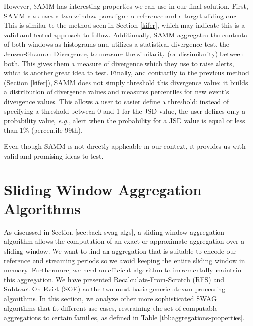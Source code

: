 However, SAMM has interesting properties we can use in our final solution. First, SAMM also uses a two-window paradigm: a reference and a target sliding one. This is similar to the method seen in Section \ref{kifer}, which may indicate this is a valid and tested approach to follow. Additionally, SAMM aggregates the contents of both windows as histograms and utilizes a statistical divergence test, the Jensen-Shannon Divergence, to measure the similarity (or dissimilarity) between both. This gives them a measure of divergence which they use to raise alerts, which is another great idea to test. Finally, and contrarily to the previous method (Section \ref{kifer}), SAMM does not simply threshold this divergence value: it builds a distribution of divergence values and measures percentiles for new event's divergence values. This allows a user to easier define a threshold: instead of specifying a threshold between 0 and 1 for the JSD value, the user defines only a probability value, \textit{e.g.}, alert when the probability for a JSD value is equal or less than 1\% (percentile 99th).

Even though SAMM is not directly applicable in our context, it provides us with valid and promising ideas to test.


\section{Sliding Window Aggregation Algorithms} \label{sec:sota-swag-algs}

As discussed in Section \ref{sec:back-swag-algs}, a sliding window aggregation algorithm allows the computation of an exact or approximate aggregation over a sliding window. We want to find an aggregation that is suitable to encode our reference and streaming periods so we avoid keeping the entire sliding window in memory. Furthermore, we need an efficient algorithm to incrementally maintain this aggregation. We have presented Recalculate-From-Scratch (RFS) and Subtract-On-Evict (SOE) as the two most basic generic stream processing algorithms. In this section, we analyze other more sophisticated SWAG algorithms that fit different use cases, restraining the set of computable aggregations to certain families, as defined in Table \ref{tbl:aggregations-properties}.

